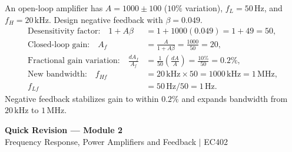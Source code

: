 \documentclass[12pt,a4paper]{article}
\begin{document}
\begin{tcolorbox}[examplebox, title={Gain Stabilization and Bandwidth Expansion Calculation}]
An open-loop amplifier has $A = 1000 \pm 100$ ($10\%$ variation), $f_L = 50\,\mathrm{Hz}$, and $f_H = 20\,\mathrm{kHz}$. Design negative feedback with $\beta = 0.049$.
\[
\begin{aligned}
\text{Desensitivity factor:}\quad 1 + A\beta &= 1 + 1000(0.049) = 1 + 49 = 50,\\
\text{Closed-loop gain:}\quad A_f &= \frac{A}{1 + A\beta} = \frac{1000}{50} = 20,\\
\text{Fractional gain variation:}\quad \frac{dA_f}{A_f} &= \frac{1}{50}\left(\frac{dA}{A}\right) = \frac{10\%}{50} = 0.2\%,\\
\text{New bandwidth:}\quad f_{Hf} &= 20\,\mathrm{kHz} \times 50 = 1000\,\mathrm{kHz} = 1\,\mathrm{MHz},\\
f_{Lf} &= 50\,\mathrm{Hz} / 50 = 1\,\mathrm{Hz}.
\end{aligned}
\]
Negative feedback stabilizes gain to within $0.2\%$ and expands bandwidth from $20\,\mathrm{kHz}$ to $1\,\mathrm{MHz}$.
\end{tcolorbox}

\newpage

\begin{center}
  {\large\bfseries\color{myred} Quick Revision --- Module 2}\\[3pt]
  {\small\color{mydark} Frequency Response, Power Amplifiers and Feedback $|$ EC402}
\end{center}
\noindent{\color{myred}\rule{\linewidth}{1.2pt}}
\vspace{4pt}
\end{document}
